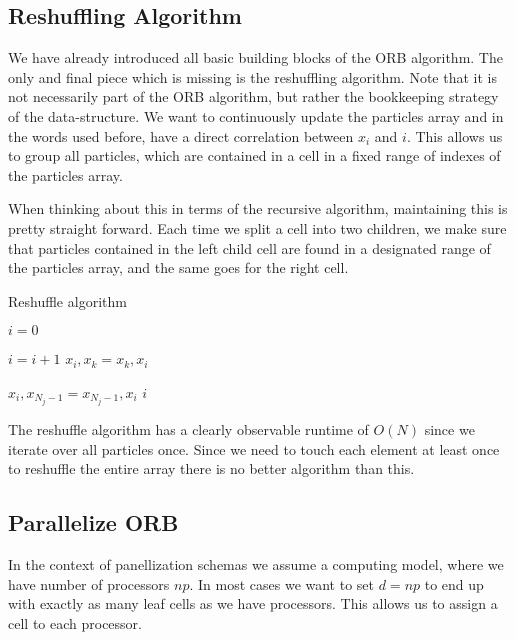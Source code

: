 \documentclass[]{article}
\begin{document}
\subsection{Reshuffling Algorithm}

We have already introduced all basic building blocks of the ORB algorithm. The only and final piece which is missing is the reshuffling algorithm. Note that it is not necessarily part of the ORB algorithm, but rather the bookkeeping strategy of the data-structure. We want to continuously update the particles array and in the words used before, have a direct correlation between $x_i$ and $i$. This allows us to group all particles, which are contained in a cell in a fixed range of indexes of the particles array. 

When thinking about this in terms of the recursive algorithm, maintaining this is pretty straight forward. Each time we split a cell into two children, we make sure that particles contained in the left child cell are found in a designated range of the particles array, and the same goes for the right cell.

\begin{algorithm}[H]
	\caption{Reshuffle algorithm}\label{euclid}
	\begin{algorithmic}[1]
		\State $i = 0$
		
		\State $i = i + 1$
		\State $x_{i}, x_{k} = x_{k}, x_{i}$
		\EndIf
		\EndFor
		
		\State $ x_{i}, x_{N_j-1} = x_{N_j-1}, x_{i}$
		\State \Return $i$
		\EndProcedure
	\end{algorithmic}
\end{algorithm}

The reshuffle algorithm has a clearly observable runtime of $O(N)$ since we iterate over all particles once. Since we need to touch each element at least once to reshuffle the entire array there is no better algorithm than this.


\subsection{Parallelize ORB }

In the context of panellization schemas we assume a computing model, where we have number of processors $np$. In most cases we want to set $d = np$ to end up with exactly as many leaf cells as we have processors. This allows us to assign a cell to each processor. 
\end{document}
